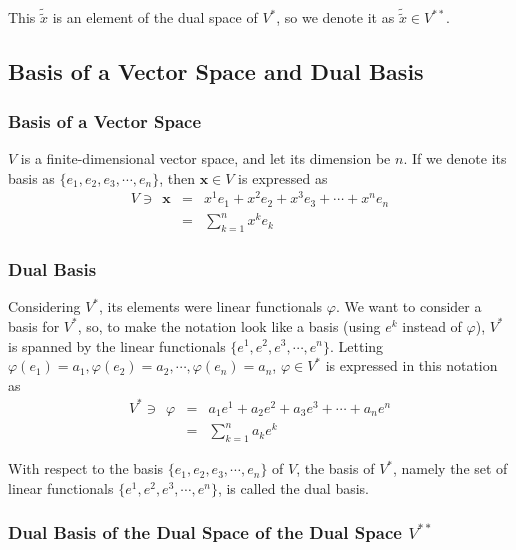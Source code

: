 \documentclass[uplatex,a4j,12pt,dvipdfmx]{jsarticle}
\begin{document}
This $\tilde{\tilde{x}}$ is an element of the dual space of $V^{*}$, so we denote it as $\tilde{\tilde{x}} \in V^{**}$.


\subsection{Basis of a Vector Space and Dual Basis}

\subsubsection{Basis of a Vector Space}

$V$ is a finite-dimensional vector space, and let its dimension be $n$.
If we denote its basis as $\{ e_{1}, e_{2}, e_{3}, \cdots , e_{n} \}$,
then $\mathbf{x} \in V$ is expressed as
\[
	\begin{array}{rcl}
		V \ni \ \
		\mathbf{x}
		 & = &
		x^{1} e_{1} + x^{2} e_{2} + x^{3} e_{3} + \cdots + x^{n} e_{n}
		\\
		 & = &
		\displaystyle \sum_{k=1}^{n} x^{k} e_{k}
	\end{array}
\]

\subsubsection{Dual Basis}

Considering $V^{*}$, its elements were linear functionals $\varphi$.
We want to consider a basis for $V^{*}$, so, to make the notation look like a basis (using $e^{k}$ instead of $\varphi$),
$V^{*}$ is spanned by the linear functionals $\{ e^{1}, e^{2}, e^{3}, \cdots , e^{n} \}$.
Letting $\varphi(e_{1}) = a_{1}, \varphi(e_{2}) = a_{2}, \cdots ,\varphi(e_{n}) = a_{n}$,
$\varphi \in V^{*}$ is expressed in this notation as
\[
	\begin{array}{rcl}
		V^{*} \ni \ \ \varphi
		 & = &
		a_{1} e^{1} + a_{2} e^{2} + a_{3} e^{3} + \cdots + a_{n} e^{n}
		\\
		 & = &
		\displaystyle \sum_{k=1}^{n} a_{k} e^{k}
	\end{array}
\]

With respect to the basis
$\{ e_{1}, e_{2}, e_{3}, \cdots , e_{n} \}$
of $V$,
the basis of $V^{*}$,
namely the set of linear functionals
$\{ e^{1}, e^{2}, e^{3}, \cdots , e^{n} \}$,
is called the dual basis.

\subsubsection{Dual Basis of the Dual Space of the Dual Space $V^{**}$}
\end{document}
